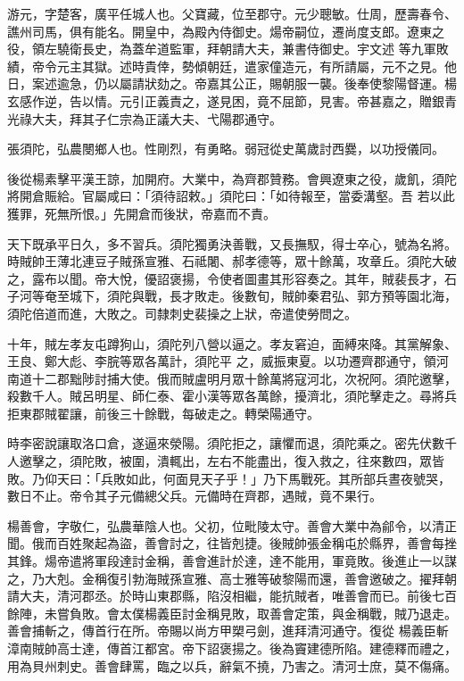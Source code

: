 \begin{pinyinscope}
 游元，字楚客，廣平任城人也。父寶藏，位至郡守。元少聰敏。仕周，歷壽春令、譙州司馬，俱有能名。開皇中，為殿內侍御史。煬帝嗣位，遷尚度支郎。遼東之役，領左驍衛長史，為蓋牟道監軍，拜朝請大夫，兼書侍御史。宇文述
 等九軍敗績，帝令元主其獄。述時貴倖，勢傾朝廷，遣家僮造元，有所請屬，元不之見。他日，案述逾急，仍以屬請狀劾之。帝嘉其公正，賜朝服一襲。後奉使黎陽督運。楊玄感作逆，告以情。元引正義責之，遂見困，竟不屈節，見害。帝甚嘉之，贈銀青光祿大夫，拜其子仁宗為正議大夫、弋陽郡通守。



 張須陀，弘農閿鄉人也。性剛烈，有勇略。弱冠從史萬歲討西爨，以功授儀同。



 後從楊素擊平漢王諒，加開府。大業中，為齊郡贊務。會興遼東之役，歲飢，須陀將開倉賑給。官屬咸曰：「須待詔敕。」須陀曰：「如待報至，當委溝壑。吾
 若以此獲罪，死無所恨。」先開倉而後狀，帝嘉而不責。



 天下既承平日久，多不習兵。須陀獨勇決善戰，又長撫馭，得士卒心，號為名將。時賊帥王薄北連豆子賊孫宣雅、石祗闍、郝孝德等，眾十餘萬，攻章丘。須陀大破之，露布以聞。帝大悅，優詔褒揚，令使者圖畫其形容奏之。其年，賊裴長才，石子河等奄至城下，須陀與戰，長才敗走。後數旬，賊帥秦君弘、郭方預等園北海，須陀倍道而進，大敗之。司隸刺史裴操之上狀，帝遣使勞問之。



 十年，賊左孝友屯蹲狗山，須陀列八營以逼之。孝友窘迫，面縛來降。其黨解象、王良、鄭大彪、李脘等眾各萬計，須陀平
 之，威振東夏。以功遷齊郡通守，領河南道十二郡黜陟討捕大使。俄而賊盧明月眾十餘萬將寇河北，次祝阿。須陀邀擊，殺數千人。賊呂明星、師仁泰、霍小漢等眾各萬餘，擾濟北，須陀擊走之。尋將兵拒東郡賊翟讓，前後三十餘戰，每破走之。轉榮陽通守。



 時李密說讓取洛口倉，遂逼來滎陽。須陀拒之，讓懼而退，須陀乘之。密先伏數千人邀擊之，須陀敗，被圍，潰輒出，左右不能盡出，復入救之，往來數四，眾皆敗。乃仰天曰：「兵敗如此，何面見天子乎！」乃下馬戰死。其所部兵晝夜號哭，數日不止。帝令其子元備總父兵。元備時在齊郡，遇賊，竟不果行。



 楊善會，字敬仁，弘農華陰人也。父初，位毗陵太守。善會大業中為鄃令，以清正聞。俄而百姓聚起為盜，善會討之，往皆剋捷。後賊帥張金稱屯於縣界，善會每挫其鋒。煬帝遣將軍段達討金稱，善會進計於達，達不能用，軍竟敗。後進止一以謀之，乃大剋。金稱復引勃海賊孫宣雅、高士雅等破黎陽而還，善會邀破之。擢拜朝請大夫，清河郡丞。於時山東郡縣，陷沒相繼，能抗賊者，唯善會而已。前後七百餘陣，未嘗負敗。會太僕楊義臣討金稱見敗，取善會定策，與金稱戰，賊乃退走。善會捕斬之，傳首行在所。帝賜以尚方甲槊弓劍，進拜清河通守。復從
 楊義臣斬漳南賊帥高士達，傳首江都宮。帝下詔褒揚之。後為竇建德所陷。建德釋而禮之，用為貝州刺史。善會肆罵，臨之以兵，辭氣不撓，乃害之。清河士庶，莫不傷痛。




\end{pinyinscope}
